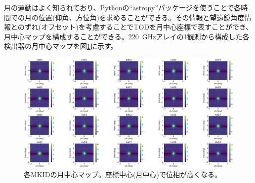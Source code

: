 月の運動はよく知られており、Pythonの``astropy\cite{astropy}''パッケージを使うことで各時間での月の位置(仰角、方位角)を求めることができる。その情報と望遠鏡角度情報とのずれ(オフセット)を考慮することでTODを月中心座標で表すことができ、月中心マップを構成することができる。\SI{220}{GHz}アレイの1観測から構成した各検出器の月中心マップを図\ref{moon_centered_6550}に示す。
\begin{figure}[htbp]
  \centering
  \includegraphics[width=0.85\columnwidth]{5_alignment/figs/moon_centered_6550.png}
  \caption{各MKIDの月中心マップ。座標中心(月中心)で位相が高くなる。}
  \label{moon_centered_6550}
\end{figure}

